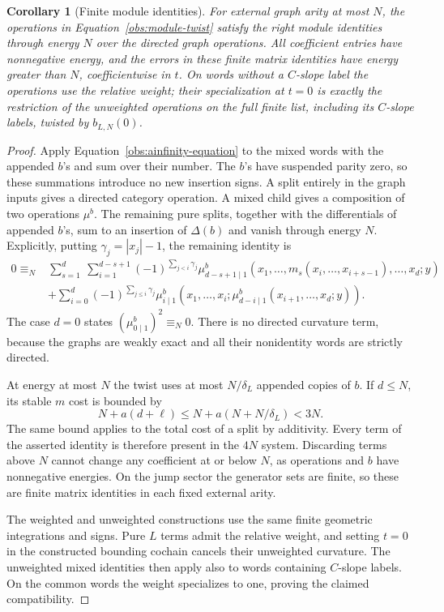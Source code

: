 \documentclass[11pt]{article}
\newtheorem{corollary}[theorem]{Corollary}
\theoremstyle{definition}
\theoremstyle{remark}
\numberwithin{equation}{section}
\begin{document}
\begin{corollary}[Finite module identities]
\label{obs:finite-module}
For external graph arity at most $N$, the operations in
Equation~\eqref{obs:module-twist} satisfy the right module
identities through energy $N$ over the directed graph
operations.  All coefficient entries have nonnegative
energy, and the errors in these finite matrix identities
have energy greater than $N$, coefficientwise in $t$.
On words without a $C$-slope label the operations use the
relative weight; their specialization at $t=0$ is exactly
the restriction of the unweighted operations on the full
finite list, including its $C$-slope labels, twisted by
$b_{L,N}(0)$.
\end{corollary}

\begin{proof}
Apply Equation~\eqref{obs:ainfinity-equation} to the mixed
words with the appended $b$'s and sum over their number.
The $b$'s have suspended parity zero, so these summations
introduce no new insertion signs.  A split entirely in the
graph inputs gives a directed category operation.  A mixed
child gives a composition of two operations $\mu^b$.
The remaining pure splits, together with the differentials
of appended $b$'s, sum to an insertion of $\Delta(b)$ and
vanish through energy $N$.  Explicitly, putting
$\gamma_j=|x_j|-1$, the remaining identity is
\begin{align*}
0\equiv_N{}&
 \sum_{s=1}^{d}\ \sum_{i=1}^{d-s+1}
 (-1)^{\sum_{j<i}\gamma_j}
 \mu^b_{d-s+1\mid1}
    (x_1,\ldots,m_s(x_i,\ldots,x_{i+s-1}),\ldots,x_d;y)\\
 &+\sum_{i=0}^{d}(-1)^{\sum_{j\le i}\gamma_j}
 \mu^b_{i\mid1}
    (x_1,\ldots,x_i;
       \mu^b_{d-i\mid1}(x_{i+1},\ldots,x_d;y)).
\end{align*}
The case $d=0$ states $(\mu^b_{0\mid1})^2\equiv_N0$.
There is no directed curvature term, because the graphs
are weakly exact and all their nonidentity words are
strictly directed.

At energy at most $N$ the twist uses at most
$N/\delta_L$ appended copies of $b$.  If $d\le N$, its
stable $m$ cost is bounded by
\[
 N+a(d+\ell)\le N+a(N+N/\delta_L)<3N.
\]
The same bound applies to the total cost of a split by
additivity.  Every term of the asserted identity is
therefore present in the $4N$ system.  Discarding terms
above $N$ cannot change any coefficient at or below $N$,
as operations and $b$ have nonnegative energies.  On the
jump sector the generator sets are finite, so these are
finite matrix identities in each fixed external arity.

The weighted and unweighted constructions use the same
finite geometric integrations and signs.  Pure $L$ terms
admit the relative weight, and setting $t=0$ in the
constructed bounding cochain cancels their unweighted
curvature.  The unweighted mixed identities then apply
also to words containing $C$-slope labels.  On the common
words the weight specializes to one, proving the claimed
compatibility.
\end{proof}
\end{document}
